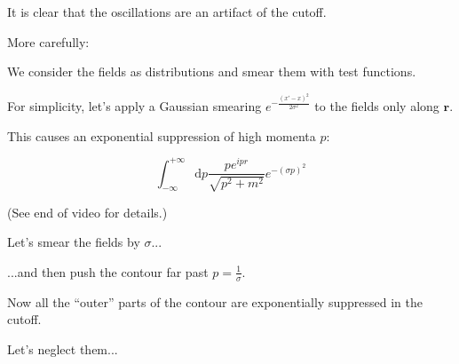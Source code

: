 \documentclass{beamer}
\newcommand{\integrand}{\frac{p e^{ipr}}{\sqrt{p^2 + m^2}}}
\newcommand{\vr}{\mathbf{r}}
\newcommand{\diffop}{\mathop{}\!\mathrm{d}}
\newcommand{\dip}{\diffop p}
\newcommand{\intii}{\int_{-\infty}^{+\infty}}
\begin{document}
\begin{frame}
It is clear that the oscillations are an \alert{artifact of the cutoff}.

\bigskip
\pause
More carefully:

\pause
We consider the fields as \alert{distributions} and \alert{smear} them with test functions.
\end{frame}


\begin{frame}
For simplicity, let's apply a \alert{Gaussian} smearing $e^{-\frac{(x' - x)^2}{2\sigma^2}}$ to the fields only along $\vr$.

\medskip
\pause
This causes an exponential suppression of high momenta $p$:

\begin{equation*}
\intii \dip \integrand e^{-(\sigma p)^2}
\end{equation*}

\pause
\medskip
(See end of video for details.)
\end{frame}



\begin{frame}
Let's smear the fields by $\sigma$...

\medskip
\pause
...and then push the contour far past $p = \frac{1}{\sigma}$.
\end{frame}




\begin{frame}
Now all the ``outer'' parts of the contour are exponentially suppressed in the cutoff.

\medskip
\pause
Let's neglect them...
\end{frame}
\end{document}
